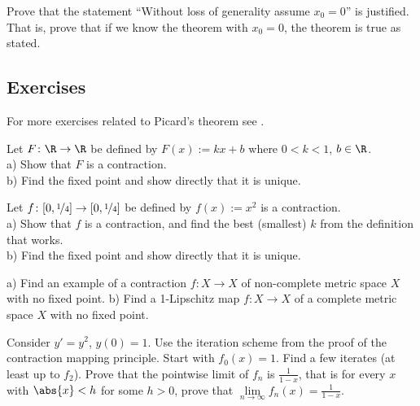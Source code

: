 \documentclass[12pt]{book}
\begin{document}
\begin{exercise}
Prove that the statement ``Without loss of generality assume $x_0 = 0$'' is
justified.
That is, prove that if we know the theorem with $x_0 = 0$, the
theorem is true as stated.
\end{exercise}

\subsection*{Exercises}

\begin{exnote}
For more exercises related to Picard's theorem see .
\end{exnote}

\begin{exercise}
Let $F \colon \R \to \R$ be defined by
$F(x) := kx + b$ where $0 < k < 1$, $b \in \R$.\\
a) Show that $F$ is a contraction.\\
b) Find the fixed
point and show directly that it is unique.
\end{exercise}

\begin{exercise}
Let $f \colon [0,\nicefrac{1}{4}] \to [0,\nicefrac{1}{4}]$ be defined by
$f(x) := x^2$ is a contraction.\\
a) Show that $f$
is a contraction, and find the best (smallest) $k$ from the definition that works.\\
b) Find the fixed point and show directly that it is unique.
\end{exercise}

\begin{exercise} \label{exercise:nofixedpoint}
a) Find an example of a contraction $f \colon X \to X$
of non-complete metric space $X$ with no
fixed point.
b) Find a 1-Lipschitz map $f \colon X \to X$ of a complete metric space $X$ with no fixed point.
\end{exercise}

\begin{exercise}
Consider $y' =y^2$, $y(0)=1$.
Use the iteration scheme
from the proof of the contraction mapping principle.
Start with $f_0(x) = 1$.
Find a 
few iterates (at least up to $f_2$).
Prove that
the pointwise limit of $f_n$ is $\frac{1}{1-x}$, that is for every $x$
with $\abs{x} < h$ for some $h > 0$,
prove that $\lim\limits_{n\to\infty}f_n(x) = \frac{1}{1-x}$.
\end{exercise}
\end{document}
